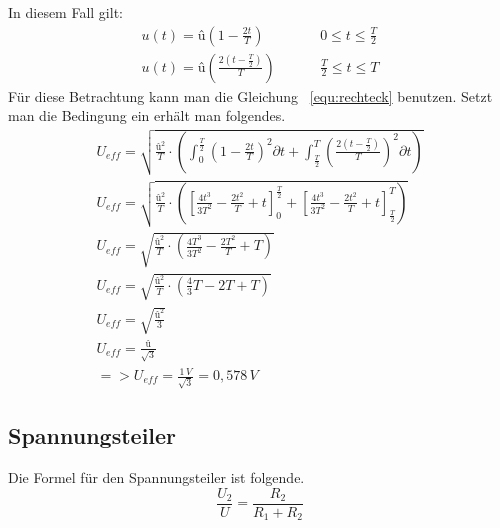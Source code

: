             In diesem Fall gilt:
            \begin{align}
                u(t)=û\left(1-\frac{2t}{T}\right)  &\hspace{1cm}0 \leq t \leq \frac{T}{2}\\
                u(t)=û\left(\frac{2(t-\frac{T}{2})}{T}\right) &\hspace{1cm} \frac{T}{2} \leq t \leq T
            \end{align}
            Für diese Betrachtung kann man die Gleichung ~\ref{equ:rechteck} benutzen. Setzt man die Bedingung ein erhält man folgendes.
            \begin{gather}
                U_{eff}=\sqrt{\frac{û^2}{T}\cdot\left(\int_{0}^{\frac{T}{2}} \left(1-\frac{2t}{T}\right)^2\partial t + \int_{\frac{T}{2}}^{T} \left(\frac{2(t-\frac{T}{2})}{T}\right)^2\partial t\right)}    \\
                U_{eff}=\sqrt{\frac{û^2}{T}\cdot\left(\left[\frac{4t^3}{3T^2}-\frac{2t^2}{T}+t\right]_{0}^{\frac{T}{2}} + \left[\frac{4t^3}{3T^2}-\frac{2t^2}{T}+t\right]_{\frac{T}{2}}^{T}\right)}\\
                U_{eff}=\sqrt{\frac{û^2}{T}\cdot\left(\frac{4T^3}{3T^2}-\frac{2T^2}{T}+T \right)}\\
                U_{eff}=\sqrt{\frac{û^2}{T}\cdot\left(\frac{4}{3}T-{2T}+T \right)}\\
                U_{eff}=\sqrt{\frac{û^2}{3}}\\
                U_{eff}=\frac{û}{\sqrt{3}}\\
                => U_{eff}=\frac{1\,V}{\sqrt{3}}= 0,578\,V
            \end{gather}
        \subsection{Spannungsteiler}
            Die Formel für den Spannungsteiler ist folgende.
            \begin{equation}
                \frac{U_2}{U}= \frac{R_2}{R_1+R_2}
            \end{equation}

        


            